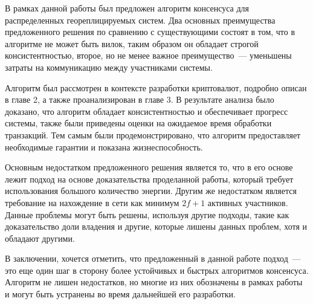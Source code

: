 В рамках данной работы был предложен алгоритм консенсуса для распределенных геореплицируемых систем.
Два основных преимущества предложенного решения по сравнению с существующими состоят в том, что в алгоритме не может быть вилок, таким образом он обладает строгой консистентностью, второе, но не менее важное преимущество~--- уменьшены затраты на коммуникацию между участниками системы.

Алгоритм был рассмотрен в контексте разработки криптовалют, подробно описан в главе 2, а также проанализирован в главе 3. В результате анализа было доказано, что алгоритм обладает консистентностью и обеспечивает прогресс системы, также были приведены оценки на ожидаемое время обработки транзакций. Тем самым были продемонстрировано, что алгоритм предоставляет необходимые гарантии и показана жизнеспособность.

Основным недостатком предложенного решения является то, что в его основе лежит подход на основе доказательства проделанной работы, который требует использования большого количество энергии. Другим же недостатком является требование на нахождение в сети как минимум $2f+1$ активных участников. Данные проблемы могут быть решены, используя другие подходы, такие как доказательство доли владения и другие, которые лишены данных проблем, хотя и обладают другими.

В заключении, хочется отметить, что предложенный в данной работе подход~--- это еще один шаг в сторону более устойчивых и быстрых алгоритмов консенсуса. Алгоритм не лишен недостатков, но многие из них обозначены в рамках работы и могут быть устранены во время дальнейшей его разработки.

